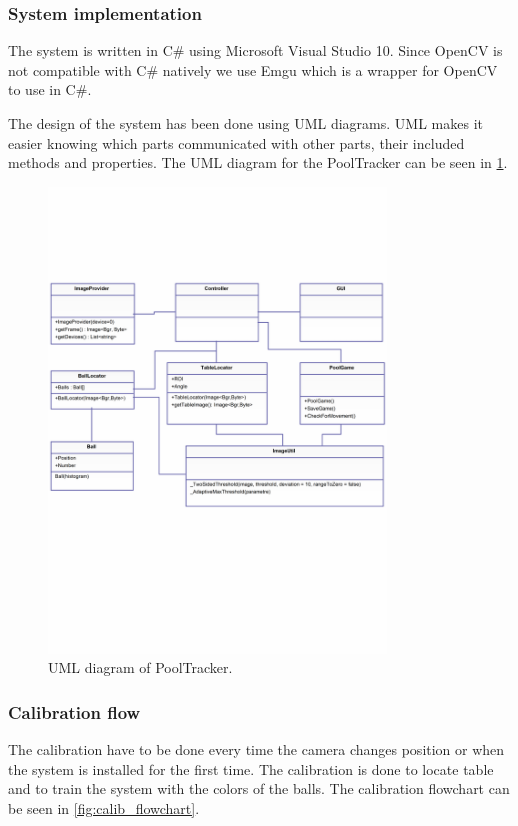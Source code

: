 \subsubsection{System implementation}
The system is written in C\# using Microsoft Visual Studio 10. Since OpenCV\cite{opencv} is not compatible with C\# natively we use Emgu\cite{emgu} which is a wrapper for OpenCV to use in C\#. 

The design of the system has been done using UML diagrams. UML makes it easier knowing which parts communicated with other parts, their included methods and properties. The UML diagram for the PoolTracker can be seen in \ref{fig:uml}.

\begin{figure}[H]
\begin{center}
\leavevmode
\includegraphics[width=0.8\textwidth]{images/UML}
\end{center}
\caption{UML diagram of PoolTracker.}
\label{fig:uml}
\end{figure}

\subsubsection{Calibration flow}
The calibration have to be done every time the camera changes position or when the system is installed for the first time. The calibration is done to locate table and to train the system with the colors of the balls. The calibration flowchart can be seen in \ref{fig:calib_flowchart}.\\

